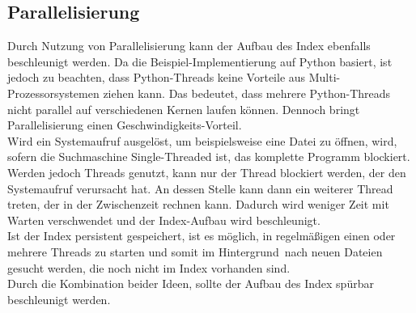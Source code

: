 \subsection{Parallelisierung}
Durch Nutzung von Parallelisierung kann der Aufbau des Index ebenfalls beschleunigt werden. Da die Beispiel-Implementierung auf Python basiert, ist jedoch zu beachten, dass Python-Threads keine Vorteile aus Multi-Prozessorsystemen ziehen kann. Das bedeutet, dass mehrere Python-Threads nicht parallel auf verschiedenen Kernen laufen können. Dennoch bringt Parallelisierung einen Geschwindigkeits-Vorteil.
\\
Wird ein Systemaufruf ausgelöst, um beispielsweise eine Datei zu öffnen, wird, sofern die Suchmaschine Single-Threaded ist, das komplette Programm blockiert. Werden jedoch Threads genutzt, kann nur der Thread blockiert werden, der den Systemaufruf verursacht hat. An dessen Stelle kann dann ein weiterer Thread treten, der in der Zwischenzeit rechnen kann. Dadurch wird weniger Zeit mit Warten verschwendet und der Index-Aufbau wird beschleunigt. 
\\
Ist der Index persistent gespeichert, ist es möglich, in regelmäßigen einen oder mehrere Threads zu starten und somit \glqq im Hintergrund\grqq\ nach neuen Dateien gesucht werden, die noch nicht im Index vorhanden sind. 
\\
Durch die Kombination beider Ideen, sollte der Aufbau des Index spürbar beschleunigt werden.

